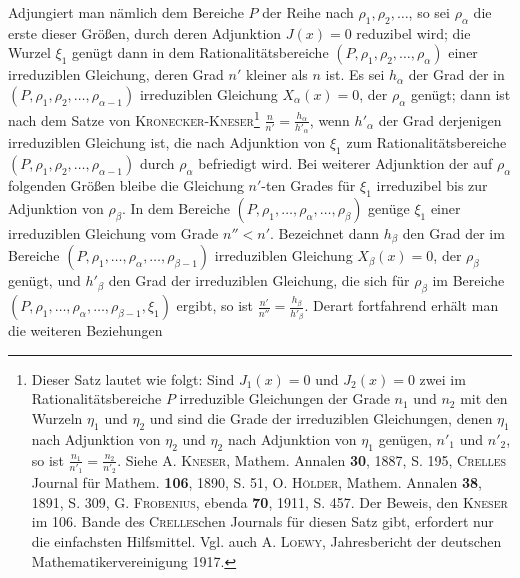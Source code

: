 \par\noindent\hspace*{\parindent}Adjungiert man nämlich dem Bereiche \(P\) der Reihe nach \(\rho_1,\rho_2,\ldots\), so sei \(\rho_\alpha\) die erste dieser Größen, durch deren Adjunktion \(J(x)=0\) reduzibel wird; die Wurzel \(\xi_1\) genügt dann in dem Rationalitätsbereiche \((P,\rho_1,\rho_2,\ldots,\rho_\alpha)\) einer irreduziblen Gleichung, deren Grad \(n'\) kleiner als \(n\) ist. Es sei \(h_\alpha\) der Grad der in \((P,\rho_1,\rho_2,\ldots,\rho_{\alpha-1})\) irreduziblen Gleichung \(X_\alpha(x)=0\), der \(\rho_\alpha\) genügt; dann ist nach dem Satze von \textsc{Kronecker-Kneser}\renewcommand{\thefootnote}{**)}\footnote{Dieser Satz lautet wie folgt: Sind \(J_1(x)=0\) und \(J_2(x)=0\) zwei im Rationalitätsbereiche \(P\) irreduzible Gleichungen der Grade \(n_1\) und \(n_2\) mit den Wurzeln \(\eta_1\) und \(\eta_2\) und sind die Grade der irreduziblen Gleichungen, denen \(\eta_1\) nach Adjunktion von \(\eta_2\) und \(\eta_2\) nach Adjunktion von \(\eta_1\) genügen, \(n'_1\) und \(n'_2\), so ist \(\frac{n_1}{n'_1}=\frac{n_2}{n'_2}\). Siehe \textsc{A. Kneser}, Mathem. Annalen \textbf{30}, 1887, S. 195, \textsc{Crelles} Journal für Mathem. \textbf{106}, 1890, S. 51, \textsc{O. Hölder}, Mathem. Annalen \textbf{38}, 1891, S. 309, \textsc{G. Frobenius}, ebenda \textbf{70}, 1911, S. 457. Der Beweis, den \textsc{Kneser} im 106. Bande des \textsc{Crelles}chen Journals für diesen Satz gibt, erfordert nur die einfachsten Hilfsmittel. Vgl. auch \textsc{A. Loewy}, Jahresbericht der deutschen Mathematikervereinigung 1917.} \(\frac n{n'}=\frac{h_\alpha}{h'_\alpha}\), wenn \(h'_\alpha\) der Grad derjenigen irreduziblen Gleichung ist, die nach Adjunktion von \(\xi_1\) zum Rationalitätsbereiche \((P,\rho_1,\rho_2,\ldots,\rho_{\alpha-1})\) durch \(\rho_\alpha\) befriedigt wird. Bei weiterer Adjunktion der auf \(\rho_\alpha\) folgenden Größen bleibe die Gleichung \(n'\)-ten Grades für \(\xi_1\) irreduzibel bis zur Adjunktion von \(\rho_\beta\). In dem Bereiche \((P,\rho_1,\ldots,\rho_\alpha,\ldots,\rho_\beta)\) genüge \(\xi_1\) einer irreduziblen Gleichung vom Grade \(n''<n'\). Bezeichnet dann \(h_\beta\) den Grad der im Bereiche \((P,\rho_1,\ldots,\rho_\alpha,\ldots,\rho_{\beta-1})\) irreduziblen Gleichung \(X_\beta(x)=0\), der \(\rho_\beta\) genügt, und \(h'_\beta\) den Grad der irreduziblen Gleichung, die sich für \(\rho_\beta\) im Bereiche \((P,\rho_1,\ldots,\rho_\alpha,\ldots,\rho_{\beta-1},\xi_1)\) ergibt, so ist \(\frac{n'}{n''}=\frac{h_\beta}{h'_\beta}\). Derart fortfahrend erhält man die weiteren Beziehungen
